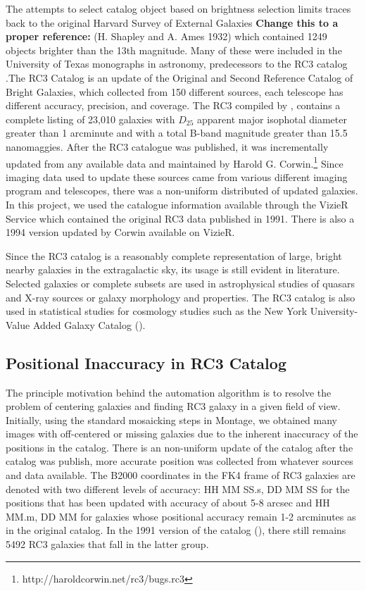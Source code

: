 \documentclass[authoryear, 12pt,5p, times]{elsarticle}
\begin{document}
The attempts to select catalog object based on brightness selection limits traces back to the original Harvard Survey of External Galaxies \textbf{Change this to a proper reference: }(H. Shapley and A. Ames 1932) which contained 1249 objects brighter than the 13th magnitude. Many of these were included in the University of Texas monographs in astronomy, predecessors to the  RC3 catalog .The RC3 Catalog is an update of the Original and Second Reference Catalog of Bright Galaxies, which collected from 150 different sources, each telescope has different accuracy, precision, and coverage. The RC3 compiled by \citet{rc3}, contains a  complete listing of 23,010 galaxies with $D_{25}$ apparent major isophotal diameter  greater than 1 arcminute and with a total B-band magnitude greater than 15.5 nanomaggies. After the RC3 catalogue was published, it was incrementally updated from any available data and maintained by Harold G. Corwin.\footnote{http://haroldcorwin.net/rc3/bugs.rc3} Since imaging data used to update these sources came from various different imaging program and telescopes, there was a non-uniform distributed of updated galaxies. In this project, we used the catalogue information available through the VizieR Service  which contained the original  RC3 data published in 1991. There is also a 1994 version updated by Corwin available on VizieR. 

Since the RC3 catalog  is a reasonably complete representation of large, bright nearby galaxies in the extragalactic sky, its usage is still evident in literature. Selected galaxies or complete subsets are used in astrophysical studies of  quasars and X-ray sources \citep{xray} or  galaxy morphology and properties.  The RC3 catalog is also used in statistical studies  for cosmology studies such as the New York University-Value Added Galaxy Catalog (\citealp{nyuvagc}).

\subsection{Positional Inaccuracy in RC3 Catalog\label{sec:position}}

The principle motivation behind the automation algorithm is to resolve the problem of centering galaxies and finding RC3 galaxy in a given field of view. Initially, using the standard mosaicking steps in Montage, we obtained many images with  off-centered or missing galaxies due to the inherent inaccuracy of the positions in the catalog. There is an non-uniform update of the catalog after the catalog was publish, more accurate position was collected from whatever sources and data available. The B2000 coordinates in the FK4 frame of  RC3 galaxies are denoted with two different levels of accuracy: HH MM SS.s, DD MM SS for the positions that has been updated  with accuracy of about 5-8 arcsec and  HH MM.m, DD MM for galaxies whose positional accuracy remain  1-2 arcminutes as in the original catalog.  In the 1991 version of the catalog (\citealp{rc31991}), there still remains 5492 RC3 galaxies that fall in the latter group.
\end{document}
